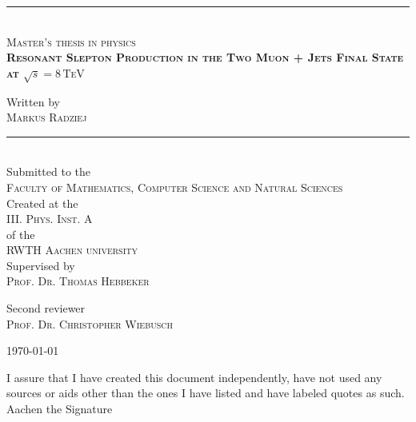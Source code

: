 \documentclass[11pt,a4paper,twoside,openright,DIV=13,BCOR=1cm]{scrbook} %
\numberwithin{equation}{chapter} %
\numberwithin{figure}{chapter} %
\numberwithin{table}{chapter} %
\begin{document}
\pagestyle{empty}

\begin{titlepage}
  \begin{center}
    \vspace{3.0cm}
    
    \rule{\linewidth}{0.5pt} \\
    \textsc{Master's thesis in physics} \\[0.4cm]
    
    \doublespacing
    \textsc{\LARGE \textbf{Resonant Slepton Production in the Two Muon + Jets Final State at $\sqrt{s} = 8\,\text{TeV}$}}\\[1.5cm]
    \singlespacing
    
    Written by\\[0.2cm]
    \textsc{Markus Radziej}\\
    
    
    \rule{\linewidth}{0.5pt} \\[3cm]
    
    
    
    Submitted to the\\
    \textsc{\large Faculty of Mathematics, Computer Science and Natural Sciences}\\[1.5cm]
    Created at the\\
    \textsc{\large III. Phys. Inst. A} \\[0.2cm]
    of the\\
    \textsc{\large RWTH Aachen university} \\[0.5cm]
    
    Supervised by\\
    \textsc{Prof. Dr. Thomas Hebbeker}
    
    \vspace{0.3cm}
    Second reviewer\\
    \textsc{Prof. Dr. Christopher Wiebusch}

    \vfill
    {\large \today}
    
  \end{center}
\end{titlepage}

\clearpage{\pagestyle{empty}\cleardoublepage} %


\newpage
\noindent I assure that I have created this document independently, have not used any sources or aids other than the ones I have listed and have labeled quotes as such.\\[1.0cm]
\noindent Aachen the \hfill Signature
\end{document}

